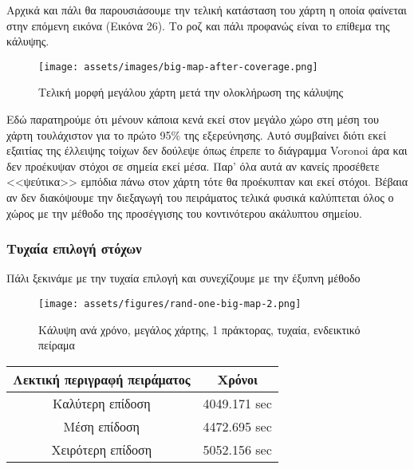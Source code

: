 Αρχικά και πάλι θα παρουσιάσουμε την τελική κατάσταση του χάρτη η οποία φαίνεται στην επόμενη εικόνα (Εικόνα 26). Το ροζ και πάλι προφανώς είναι το επίθεμα της κάλυψης.

\begin{figure}[!hb]
	\centering
	\texttt{[image: assets/images/big-map-after-coverage.png]}
	\caption{Τελική μορφή μεγάλου χάρτη μετά την ολοκλήρωση της κάλυψης}
\end{figure}

Εδώ παρατηρούμε ότι μένουν κάποια κενά εκεί στον μεγάλο χώρο στη μέση του χάρτη τουλάχιστον για το πρώτο 95\% της εξερεύνησης. Αυτό συμβαίνει διότι εκεί εξαιτίας της έλλειψης τοίχων δεν δούλεψε όπως έπρεπε το διάγραμμα Voronoi άρα και δεν προέκυψαν στόχοι σε σημεία εκεί μέσα. Παρ' όλα αυτά αν κανείς προσέθετε <<ψεύτικα>> εμπόδια πάνω στον χάρτη τότε θα προέκυπταν και εκεί στόχοι. Βέβαια αν δεν διακόψουμε την διεξαγωγή του πειράματος τελικά φυσικά καλύπτεται όλος ο χώρος με την μέθοδο της προσέγγισης του κοντινότερου ακάλυπτου σημείου. 

\subsubsection{Τυχαία επιλογή στόχων}

Πάλι ξεκινάμε με την τυχαία επιλογή και συνεχίζουμε με την έξυπνη μέθοδο


\begin{figure}[!h]
	\centering
	\texttt{[image: assets/figures/rand-one-big-map-2.png]}
	\caption{Κάλυψη ανά χρόνο, μεγάλος χάρτης, 1 πράκτορας, τυχαία, ενδεικτικό πείραμα	}
\end{figure}


\begingroup
\centering
\begin{tabular}{c | c }
	\textbf{Λεκτική περιγραφή πειράματος} & \textbf{Χρόνοι}\\ \hline{}
	Καλύτερη επίδοση & 4049.171 sec \\ \hline
	Μέση επίδοση & 4472.695 sec   \\ \hline
	Χειρότερη επίδοση & 5052.156 sec \\ 
\end{tabular}
\endgroup

